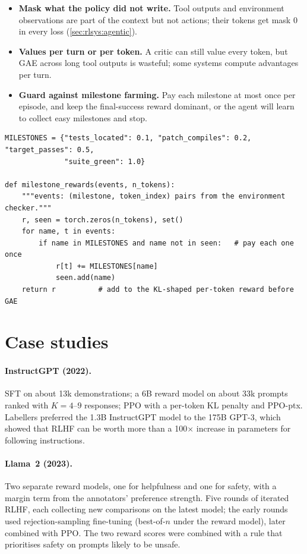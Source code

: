 \begin{itemize}
  \item \textbf{Mask what the policy did not write.} Tool outputs and environment observations are part of
        the context but not actions; their tokens get mask 0 in every loss (\cref{sec:rlsys:agentic}).
  \item \textbf{Values per turn or per token.} A critic can still value every token, but GAE across
        long tool outputs is wasteful; some systems compute advantages per turn.
  \item \textbf{Guard against milestone farming.} Pay each milestone at most once per episode, and keep the
        final-success reward dominant, or the agent will learn to collect easy milestones and stop.
\end{itemize}

\begin{lstlisting}[caption={Milestone rewards attached to the tokens that completed them.},label={lst:rlhf:milestones}]
MILESTONES = {"tests_located": 0.1, "patch_compiles": 0.2, "target_passes": 0.5,
              "suite_green": 1.0}

def milestone_rewards(events, n_tokens):
    """events: (milestone, token_index) pairs from the environment checker."""
    r, seen = torch.zeros(n_tokens), set()
    for name, t in events:
        if name in MILESTONES and name not in seen:   # pay each one once
            r[t] += MILESTONES[name]
            seen.add(name)
    return r          # add to the KL-shaped per-token reward before GAE
\end{lstlisting}

\section{Case studies}\label{sec:rlhf:cases}

\paragraph{InstructGPT (2022).} SFT on about 13k demonstrations; a 6B reward model on about 33k prompts ranked with $K=4$--$9$
responses; PPO with a per-token KL penalty and PPO-ptx. Labellers preferred the 1.3B InstructGPT model
to the 175B GPT-3, which showed that RLHF can be worth more than a 100$\times$ increase in parameters
for following instructions.

\paragraph{Llama~2 (2023).} Two separate reward models, one for helpfulness and one for safety, with
a margin term from the annotators' preference strength. Five rounds of iterated RLHF, each collecting new comparisons on
the latest model; the early rounds used rejection-sampling fine-tuning (best-of-$n$ under the reward
model), later combined with PPO. The two reward scores were combined with a rule that prioritises
safety on prompts likely to be unsafe.

